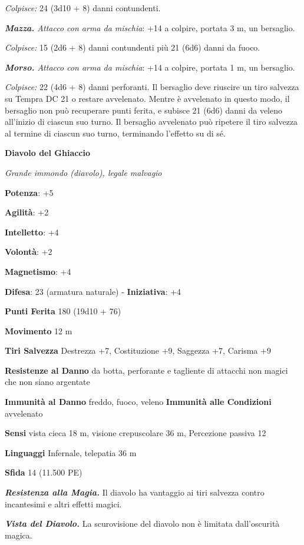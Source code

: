 \begin{multicols}{2}
\emph{Colpisce:} 24 (3d10 + 8) danni contundenti.

\emph{\textbf{Mazza.} Attacco con arma da mischia}: +14 a colpire,
portata 3 m, un bersaglio.

\emph{Colpisce:} 15 (2d6 + 8) danni contundenti più 21 (6d6) danni da
fuoco.

\emph{\textbf{Morso.} Attacco con arma da mischia}: +14 a colpire,
portata 1 m, un bersaglio.

\emph{Colpisce:} 22 (4d6 + 8) danni perforanti. Il bersaglio deve
riuscire un tiro salvezza su Tempra DC 21 o restare avvelenato.
Mentre è avvelenato in questo modo, il bersaglio non può recuperare
punti ferita, e subisce 21 (6d6) danni da veleno all'inizio di ciascun
suo turno. Il bersaglio avvelenato può ripetere il tiro salvezza al
termine di ciascun suo turno, terminando l'effetto su di sé.

\textbf{Diavolo del Ghiaccio}

\emph{Grande immondo (diavolo), legale malvagio}

\textbf{Potenza}: +5

\textbf{Agilità}: +2

\textbf{Intelletto}: +4

\textbf{Volontà}: +2

\textbf{Magnetismo}: +4

\textbf{Difesa}: 23 (armatura naturale) - \textbf{Iniziativa}: +4

\textbf{Punti Ferita} 180 (19d10 + 76)

\textbf{Movimento} 12 m

\textbf{Tiri Salvezza} Destrezza +7, Costituzione +9, Saggezza +7,
Carisma +9

\textbf{Resistenze al Danno} da botta, perforante e tagliente di
attacchi non magici che non siano argentate

\textbf{Immunità al Danno} freddo, fuoco, veleno \textbf{Immunità alle
Condizioni} avvelenato

\textbf{Sensi} vista cieca 18 m, visione crepuscolare 36 m, Percezione passiva
12

\textbf{Linguaggi} Infernale, telepatia 36 m 

\textbf{Sfida} 14 (11.500 PE)\smallskip

\emph{\textbf{Resistenza alla Magia.}} Il diavolo ha vantaggio ai tiri
salvezza contro incantesimi e altri effetti magici.

\emph{\textbf{Vista del Diavolo.}} La scurovisione del diavolo non è
limitata dall'oscurità magica.


\end{multicols}
